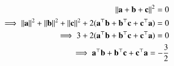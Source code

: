 \begin{align}
	\left\lVert{\mathbf{a}}+{\mathbf{b}}+{\mathbf{c}}\right\rVert^2=0
	\nonumber \\
	\implies{\left\lVert\mathbf{a}\right\rVert}^2+{\left\lVert\mathbf{b}\right\rVert}^2+{\left\lVert\mathbf{c}\right\rVert}^2+2({{\mathbf{a}^\top}{\mathbf{b}}+{\mathbf{b}^\top}{\mathbf{c}}+{\mathbf{c}^\top}{\mathbf{a}}})=0
	\nonumber \\
	\implies3+2({{\mathbf{a}^\top}{\mathbf{b}}+{\mathbf{b}^\top}{\mathbf{c}}+{\mathbf{c}^\top}{\mathbf{a}}})=0\nonumber \\
	\implies{\mathbf{a}^\top}{\mathbf{b}}+{\mathbf{b}^\top}{\mathbf{c}}+{\mathbf{c}^\top}\mathbf{a}=-\frac{3}{2}
\end{align}
